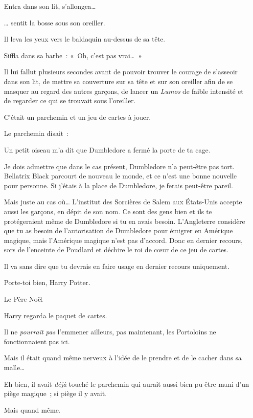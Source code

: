 Entra dans son lit, s'allongea…

… sentit la bosse sous son oreiller.

Il leva les yeux vers le baldaquin au-dessus de sa tête.

Siffla dans sa barbe~: «~Oh, c'est pas vrai…~»

Il lui fallut plusieurs secondes avant de pouvoir trouver le courage de s'asseoir dans son lit, de mettre sa couverture sur sa tête et sur son oreiller afin de se masquer au regard des autres garçons, de lancer un \emph{Lumos} de faible intensité et de regarder ce qui se trouvait sous l'oreiller.

C'était un parchemin et un jeu de cartes à jouer.

Le parchemin disait~:

\begin{writtenNote}
Un petit oiseau m'a dit que Dumbledore a fermé la porte de ta cage.

Je dois admettre que dans le cas présent, Dumbledore n'a peut-être pas tort.
Bellatrix Black parcourt de nouveau le monde, et ce n'est une bonne nouvelle pour personne.
Si j'étais à la place de Dumbledore, je ferais peut-être pareil.

Mais juste au cas où…
L'institut des Sorcières de Salem aux États-Unis accepte aussi les garçons, en dépit de son nom.
Ce sont des gens bien et ils te protégeraient même de Dumbledore si tu en avais besoin.
L'Angleterre considère que tu as besoin de l'autorisation de Dumbledore pour émigrer en Amérique magique, mais l'Amérique magique n'est pas d'accord.
Donc en dernier recours, sors de l'enceinte de Poudlard et déchire le roi de cœur de ce jeu de cartes.

Il va sans dire que tu devrais en faire usage en dernier recours uniquement.

Porte-toi bien, Harry Potter.

Le Père Noël
\end{writtenNote}

Harry regarda le paquet de cartes.

Il ne \emph{pourrait pas} l'emmener ailleurs, pas maintenant, les Portoloins ne fonctionnaient pas ici.

Mais il était quand même nerveux à l'idée de le prendre et de le cacher dans sa malle…

Eh bien, il avait \emph{déjà} touché le parchemin qui aurait aussi bien pu être muni d'un piège magique~; si piège il y avait.

Mais quand même.

